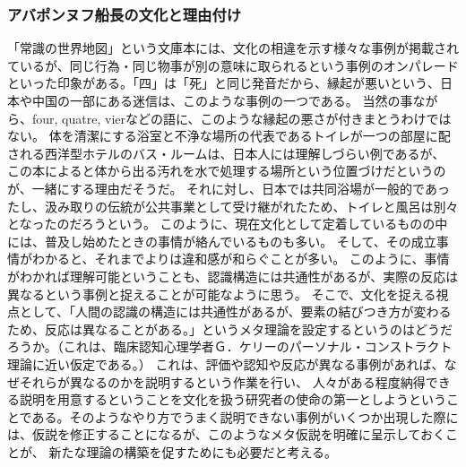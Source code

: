 \subsubsection{アバポンヌフ船長の文化と理由付け}
「常識の世界地図」という文庫本には、文化の相違を示す様々な事例が掲載されているが、同じ行為・同じ物事が別の意味に取られるという事例のオンパレードといった印象がある。「四」は「死」と同じ発音だから、縁起が悪いという、日本や中国の一部にある迷信は、このような事例の一つである。
当然の事ながら、four, quatre, vierなどの語に、このような縁起の悪さが付きまとうわけではない。
体を清潔にする浴室と不浄な場所の代表であるトイレが一つの部屋に配される西洋型ホテルのバス・ルームは、日本人には理解しづらい例であるが、
この本によると体から出る汚れを水で処理する場所という位置づけだというのが、一緒にする理由だそうだ。
それに対し、日本では共同浴場が一般的であったし、汲み取りの伝統が公共事業として受け継がれたため、トイレと風呂は別々となったのだろうという。
このように、現在文化として定着しているものの中には、普及し始めたときの事情が絡んでいるものも多い。
そして、その成立事情がわかると、それまでよりは違和感が和らぐことが多い。
このように、事情がわかれば理解可能ということも、認識構造には共通性があるが、実際の反応は異なるという事例と捉えることが可能なように思う。
そこで、文化を捉える視点として、「人間の認識の構造には共通性があるが、要素の結びつき方が変わるため、反応は異なることがある。」というメタ理論を設定するというのはどうだろうか。（これは、臨床認知心理学者Ｇ．ケリーのパーソナル・コンストラクト理論に近い仮定である。）
これは、評価や認知や反応が異なる事例があれば、なぜそれらが異なるのかを説明するという作業を行い、
人々がある程度納得できる説明を用意するということを文化を扱う研究者の使命の第一としようということである。そのようなやり方でうまく説明できない事例がいくつか出現した際には、仮説を修正することになるが、このようなメタ仮説を明確に呈示しておくことが、
新たな理論の構築を促すためにも必要だと考える。

\newpage
